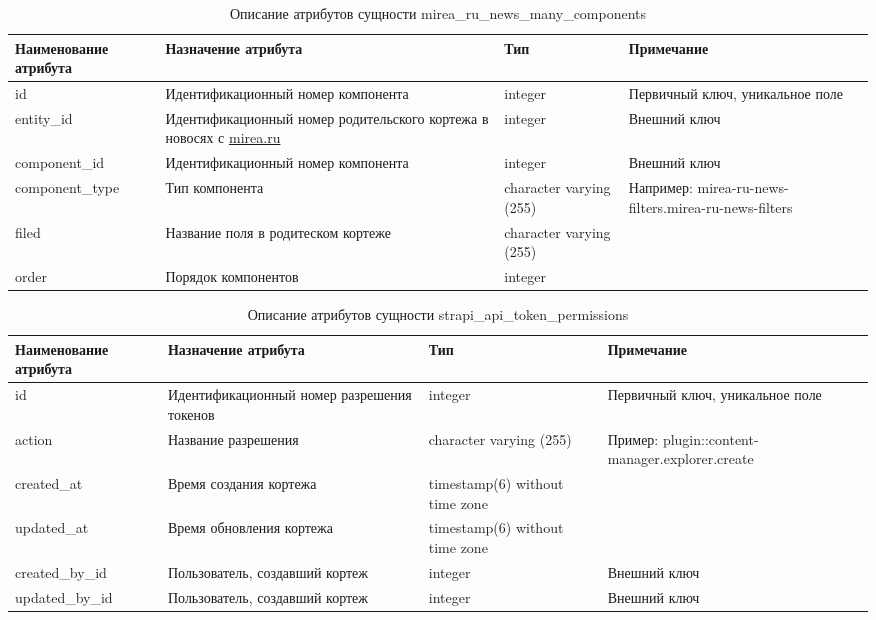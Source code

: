 \documentclass{mirea}
\begin{document}
	\begin{longtable}{ |p{}|p{}|p{}|p{}| } 
		\caption{Описание атрибутов сущности mirea\_ru\_news\_many\_components}
		\endfirsthead
		\endhead
		\hline
		Наименование атрибута & Назначение атрибута & Тип & Примечание \\ \hline
		
		id & Идентификацион\-ный номер компонента & integer & Первичный ключ, уникальное поле \\ \hline
		
		entity\_id & Идентификацион\-ный номер родительского кортежа в новосях с \url{mirea.ru} & integer & Внешний ключ \\ \hline
		
		component\_id & Идентификацион\-ный номер компонента & integer & Внешний ключ \\ \hline
		
		component\_type & Тип компонента & character varying (255) & Например: mirea-ru-news-filters.mirea-ru-news-filters \\ \hline
		
		filed & Название поля в родитеском кортеже & character varying (255) & \\ \hline
		
		order & Порядок компонентов & integer & \\ \hline	
		
	\end{longtable}

	\begin{longtable}{ |p{}|p{}|p{}|p{}| } 
		\caption{Описание атрибутов сущности strapi\_api\_token\_permissions}
		\endfirsthead
		\endhead
		\hline
		Наименование атрибута & Назначение атрибута & Тип & Примечание \\ \hline
		
		id & Идентификацион\-ный номер разрешения токенов & integer & Первичный ключ, уникальное поле \\ \hline
		
		action & Название разрешения & character varying (255) & Пример: plugin::content-manager.explorer.\-create \\ \hline
		
		created\_at & Время создания кортежа & timestamp(6) without time zone & \\ \hline
		
		updated\_at & Время обновления кортежа & timestamp(6) without time zone & \\ \hline
		
		created\_by\_id & Пользователь, создавший кортеж & integer & Внешний ключ \\ \hline
		
		updated\_by\_id & Пользователь, создавший кортеж & integer & Внешний ключ \\ \hline
		
	\end{longtable}
\end{document}
